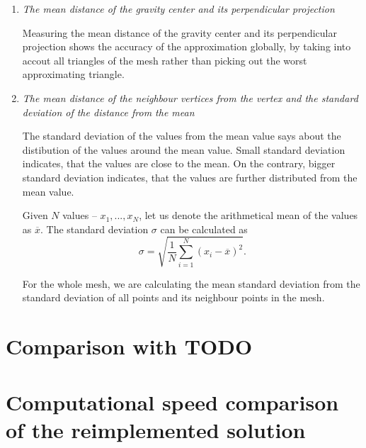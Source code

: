 \begin{enumerate}
    \item \textit{The mean distance of the gravity center and its perpendicular projection}
    
    Measuring the mean distance of the gravity center and its perpendicular 
    projection shows the accuracy of the approximation globally, by taking into
    accout all triangles of the mesh rather than picking out the worst approximating 
    triangle.

    \item \textit{The mean distance of the neighbour vertices from the vertex and the 
    standard deviation of the distance from the mean}

    The standard deviation of the values from the mean value says about the 
    distibution of the values around the mean value. Small standard deviation indicates,
    that the values are close to the mean. On the contrary, bigger standard deviation
    indicates, that the values are further distributed from the mean value.

    \begin{definition}
        Given $N$ values -- $x_1, ..., x_N$, let us denote the arithmetical mean 
        of the values as $\overline{x}$. The standard deviation $\sigma$ can be calculated
        as
        \begin{equation}
            \sigma = \sqrt{\frac{1}{N} \sum\limits_{i=1}^{N}(x_i - \overline{x})^2}. 
        \end{equation}
    \end{definition}

    For the whole mesh, we are calculating the mean standard deviation from the 
    standard deviation of all points and its neighbour points in the mesh.
\end{enumerate}

\section{Comparison with TODO}
\label{sub4.2}

\section{Computational speed comparison of the reimplemented solution}
\label{sub4.3}